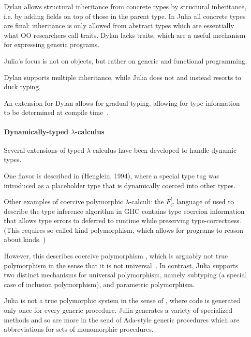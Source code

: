 Dylan allows structural inheritance from concrete types by structural inheritance, i.e. by adding fields on top of those in the parent type. In Julia all concrete types are final: inheritance is only allowed from abstract types which are essentially what OO researchers call traits. Dylan lacks traits, which are a useful mechanism for expressing generic programs.

Julia's focus is not on objects, but rather on generic and functional programming. 

Dylan supports multiple inheritance, while Julia does not and instead resorts to duck typing.

An extension for Dylan allows for gradual typing, allowing for type information to be determined at compile time~\cite{Mehnert2010}.

\paragraph{Dynamically-typed $\lambda$-calculus}

Several extensions of typed $\lambda$-calculus have been developed to handle dynamic types.

One flavor is described in (Henglein, 1994), where a special type tag 
was introduced as a placeholder type that is dynamically coerced into other
types. %

Other examples of coercive polymorphic $\lambda$-calculi: the $F^\uparrow_C$ language of \cite{Vytiniotis2012,Yorgey2012} used to describe the type inference algorithm in GHC \cite{Vytiniotis2011} contains type coercion information that allows type errors to deferred to runtime \cite{Vytiniotis2012} while preserving type-correctness. (This requires so-called kind polymorphism, which allows for programs to reason about kinds. \cite{Yorgey2012})


However, this describes coercive polymorphism \cite{Cardelli1985}, which
is arguably not true polymorphism in the sense that it is not
universal~\cite{Strachey1967}. In contrast, Julia supports two distinct
mechanisms for universal polymorphism, namely subtyping (a special case of
inclusion polymorphism), and parametric polymorphism.

Julia is not a true polymorphic system in the sense of \cite{Cardelli1985},
where code is generated only once for every generic procedure. Julia generates
a variety of specialized methods and so are more in the send of Ada-style
generic procedures which are abbreviations for sets of monomorphic procedures.


